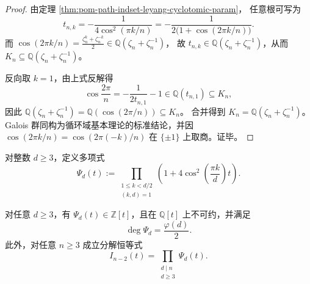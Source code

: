 \begin{proof}
由定理 \ref{thm:pom-path-indset-leyang-cyclotomic-param}，
任意根可写为
\[
t_{n,k}
=-\frac{1}{4\cos^2(\pi k/n)}
=-\frac{1}{2\bigl(1+\cos(2\pi k/n)\bigr)}.
\]
而
\(
\cos(2\pi k/n)=\frac{\zeta_n^k+\zeta_n^{-k}}{2}\in \mathbb Q(\zeta_n+\zeta_n^{-1})
\)，
故 \(t_{n,k}\in\mathbb Q(\zeta_n+\zeta_n^{-1})\)，从而 \(K_n\subseteq\mathbb Q(\zeta_n+\zeta_n^{-1})\)。

反向取 \(k=1\)，由上式反解得
\[
\cos\frac{2\pi}{n}=-\frac{1}{2t_{n,1}}-1\in\mathbb Q(t_{n,1})\subseteq K_n,
\]
因此 \(\mathbb Q(\zeta_n+\zeta_n^{-1})=\mathbb Q(\cos(2\pi/n))\subseteq K_n\)。
合并得到 \(K_n=\mathbb Q(\zeta_n+\zeta_n^{-1})\)。
Galois 群同构为循环域基本理论的标准结论，并因 \(\cos(2\pi k/n)=\cos(2\pi(-k)/n)\) 在 \(\{\pm 1\}\) 上取商。证毕。
\end{proof}

\begin{definition}\label{def:pom-psi-cyclotomic-factor}
对整数 \(d\ge 3\)，定义多项式
\[
\Psi_d(t):=
\prod_{\substack{1\le k<d/2\\(k,d)=1}}
\left(1+4\cos^2\!\left(\frac{\pi k}{d}\right)t\right).
\]
\end{definition}

\begin{theorem}\label{thm:pom-path-indset-psi-factorization-irreducible}
对任意 \(d\ge 3\)，有 \(\Psi_d(t)\in\mathbb Z[t]\)，且在 \(\mathbb Q[t]\) 上不可约，并满足
\[
\deg \Psi_d=\frac{\varphi(d)}{2}.
\]
此外，对任意 \(n\ge 3\) 成立分解恒等式
\[
I_{n-2}(t)=\prod_{\substack{d\mid n\\ d\ge 3}} \Psi_d(t).
\]
\end{theorem}


